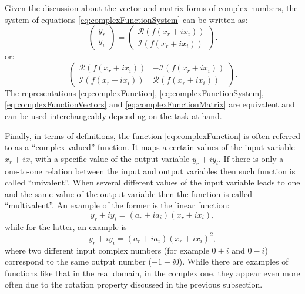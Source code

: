 \documentclass[
]{book}
\begin{document}
Given the discussion about the vector and matrix forms of complex numbers, the system of equations \eqref{eq:complexFunctionSystem} can be written as:
\begin{equation}
    \begin{pmatrix} y_r \\ y_i \end{pmatrix} =
    \begin{pmatrix} \mathcal{R}(f(x_r+ix_i)) \\ \mathcal{I}(f(x_r+ix_i)) \end{pmatrix} .
    \label{eq:complexFunctionVectors}
\end{equation}
or:
\begin{equation}
    \begin{pmatrix} \mathcal{R}(f(x_r+ix_i)) & - \mathcal{I}(f(x_r+ix_i)) \\ \mathcal{I}(f(x_r+ix_i)) & \mathcal{R}(f(x_r+ix_i)) \end{pmatrix} .
    \label{eq:complexFunctionMatrix}
\end{equation}
The representations \eqref{eq:complexFunction}, \eqref{eq:complexFunctionSystem}, \eqref{eq:complexFunctionVectors} and \eqref{eq:complexFunctionMatrix} are equivalent and can be used interchangeably depending on the task at hand.

Finally, in terms of definitions, the function \eqref{eq:complexFunction} is often referred to as a ``complex-valued'' function. It maps a certain values of the input variable \(x_r + i x_i\) with a specific value of the output variable \(y_r +i y_i\). If there is only a one-to-one relation between the input and output variables then such function is called ``univalent''. When several different values of the input variable leads to one and the same value of the output variable then the function is called ``multivalent''. An example of the former is the linear function:
\begin{equation*}
    y_r + i y_i = (a_{r} + i a_{i}) (x_{r} + i x_{i}),
\end{equation*}
while for the latter, an example is
\begin{equation*}
    y_r + i y_i = (a_{r} + i a_{i}) (x_{r} + i x_{i})^2, 
\end{equation*}
where two different input complex numbers (for example \(0 + i\) and \(0-i\)) correspond to the same output number (\(-1 + i0\)). While there are examples of functions like that in the real domain, in the complex one, they appear even more often due to the rotation property discussed in the previous subsection.
\end{document}
